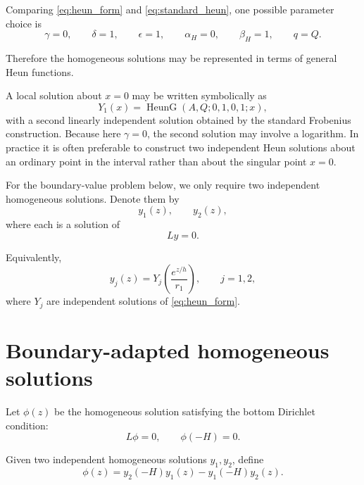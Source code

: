 \documentclass[10pt]{amsart}
\begin{document}
Comparing \eqref{eq:heun_form} and \eqref{eq:standard_heun}, one possible parameter choice is
\begin{equation}
\gamma=0,
\qquad
\delta=1,
\qquad
\epsilon=1,
\qquad
\alpha_H=0,
\qquad
\beta_H=1,
\qquad
q=Q.
\label{eq:heun_parameters}
\end{equation}

Therefore the homogeneous solutions may be represented in terms of general Heun functions.

A local solution about \(x=0\) may be written symbolically as
\begin{equation}
Y_1(x)
=
\operatorname{HeunG}
\left(
A,Q;0,1,0,1;x
\right),
\label{eq:heun_solution_1}
\end{equation}
with a second linearly independent solution obtained by the standard Frobenius construction. Because here \(\gamma=0\), the second solution may involve a logarithm. In practice it is often preferable to construct two independent Heun solutions about an ordinary point in the interval rather than about the singular point \(x=0\).

For the boundary-value problem below, we only require two independent homogeneous solutions. Denote them by
\begin{equation}
y_1(z),
\qquad
y_2(z),
\label{eq:y1_y2}
\end{equation}
where each is a solution of
\begin{equation}
L y=0.
\end{equation}

Equivalently,
\begin{equation}
y_j(z)
=
Y_j\!\left(
\frac{e^{z/h}}{r_1}
\right),
\qquad
j=1,2,
\end{equation}
where \(Y_j\) are independent solutions of \eqref{eq:heun_form}.

\section{Boundary-adapted homogeneous solutions}

Let \(\phi(z)\) be the homogeneous solution satisfying the bottom Dirichlet condition:
\begin{equation}
L\phi=0,
\qquad
\phi(-H)=0.
\label{eq:phi_def}
\end{equation}

Given two independent homogeneous solutions \(y_1,y_2\), define
\begin{equation}
\phi(z)
=
y_2(-H)y_1(z)-y_1(-H)y_2(z).
\label{eq:phi}
\end{equation}
\end{document}
